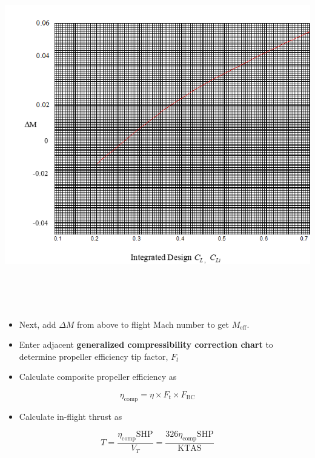 \documentclass[
]{book}
\providecommand{\tightlist}{%
  \setlength{\itemsep}{0pt}\setlength{\parskip}{0pt}}
\begin{document}
\includegraphics[width=6.99931in,height=5.93681in]{media/11/image28.png}

\begin{itemize}
\tightlist
\item
  Next, add \(\Delta M\) from above to flight Mach number to get \(M_{\text{eff}}\).
\item
  Enter adjacent \textbf{generalized compressibility correction chart} to determine propeller efficiency tip factor, \(F_t\)
\item
  Calculate composite propeller efficiency as
\end{itemize}

\[
\eta_{\text{comp}} = \eta \times F_t \times F_{\mathrm{BC}}
\]

\begin{itemize}
\tightlist
\item
  Calculate in-flight thrust as
\end{itemize}

\[
T = \frac{\eta_{\text{comp}} \mathrm{SHP}}{V_T} = \frac{326 \eta_{\text{comp}} \mathrm{SHP}}{\mathrm{KTAS}}
\]
\end{document}
